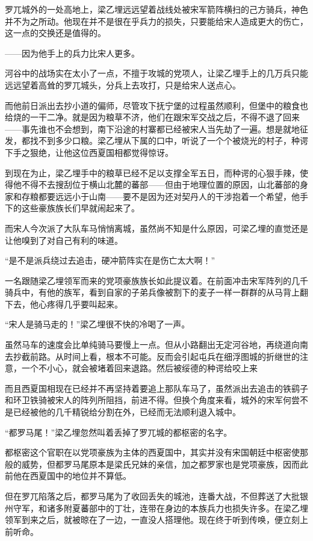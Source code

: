 罗兀城外的一处高地上，梁乙埋远远望着战线处被宋军箭阵横扫的己方骑兵，神色并不为之所动。他现在并不是很在乎兵力的损失，只要能给宋人造成更大的伤亡，这一点的交换还是值得的。

——因为他手上的兵力比宋人更多。

河谷中的战场实在太小了一点，不擅于攻城的党项人，让梁乙埋手上的几万兵只能远远望着高耸的罗兀城头，分兵上去攻打，只是给宋人送点心。

而他前日派出去抄小道的偏师，尽管攻下抚宁堡的过程虽然顺利，但堡中的粮食也给烧的一干二净。就是因为粮草不济，他们在跟宋军交战之后，不得不退了回来——事先谁也不会想到，南下沿途的村寨都已经被宋人当先劫了一遍。想是就地征发，都找不到多少口粮。梁乙埋从下属的口中，听说了一个个被烧光的村子，种谔下手之狠绝，让他这位西夏国相都觉得惊讶。

到现在为止，梁乙埋手中的粮草已经不足以支撑全军五日，而种谔的心狠手辣，使得他不得不去搜刮位于横山北麓的蕃部——但由于地理位置的原因，山北蕃部的身家和存粮都要远远小于山南——要不是因为还对契丹人的干涉抱着一个希望，他手下的这些豪族族长们早就闹起来了。

而宋人今次派了大队车马悄悄离城，虽然尚不知是什么原因，可梁乙埋的直觉还是让他嗅到了对自己有利的味道。

“是不是派兵绕过去追击，硬冲箭阵实在是伤亡太大啊！”

一名跟随梁乙埋领军而来的党项豪族族长如此提议着。在前面冲击宋军阵列的几千骑兵中，有他的族军，看到自家的子弟兵像被割下的麦子一样一群群的从马背上翻下去，他心疼得几乎要叫起来。

“宋人是骑马走的！”梁乙埋很不快的冷喝了一声。

虽然马车的速度会比单纯骑马要慢上一点。但从小路翻出无定河谷地，再绕道向南去抄截前路。从时间上看，根本不可能。反而会引起屯兵在细浮图城的折继世的注意，一个不小心，就会被堵着回来退路。然后被绥德的种谔给咬上来

而且西夏国相现在已经并不再坚持着要追上那队车马了，虽然派出去追击的铁鹞子和环卫铁骑被宋人的阵列所阻挡，前进不得。但换个角度来看，城外的宋军何尝不是已经被他的几千精锐给分割在外，已经而无法顺利退入城中。

“都罗马尾！”梁乙埋忽然叫着丢掉了罗兀城的都枢密的名字。

都枢密这个官职在以党项豪族为主体的西夏国中，其实并没有宋国朝廷中枢密使那般的威势，但都罗马尾原本是梁氏兄妹的亲信，加之都罗家也是党项豪族，因而此前他在西夏国中的地位并不算低。

但在罗兀陷落之后，都罗马尾为了收回丢失的城池，连番大战，不但葬送了大批银州守军，和诸多附夏蕃部中的丁壮，连带在身边的本族兵力也损失许多。在梁乙埋领军到来之后，就被晾在了一边，一直没人搭理他。现在终于听到传唤，便立刻上前听命。

